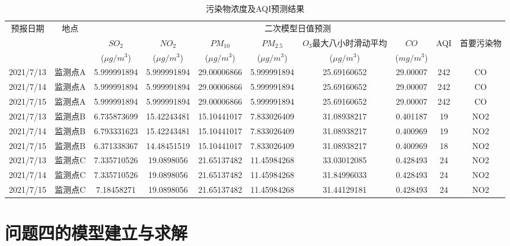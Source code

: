 \documentclass[a4paper,10pt]{my_paper}
\numberwithin{equation}{section}
\begin{document}
\begin{table}[htbp]\footnotesize
  \centering
  \caption{污染物浓度及AQI预测结果}\label{tab-Q3_AQI计算结果}%
    \begin{tabular}{cccccccccc}
    \toprule
    \multirow{3}[2]{*}{预报日期} & \multirow{3}[2]{*}{地点} & \multicolumn{8}{c}{二次模型日值预测} \\
          &       & ${SO_2}$   & ${NO_2}$   & ${PM_10}$  & ${PM_2.5}$  & ${O_3}$最大八小时滑动平均 & ${CO}$    & \multicolumn{1}{c}{\multirow{2}[1]{*}{AQI}} & \multicolumn{1}{c}{\multirow{2}[1]{*}{首要污染物}} \\
          &       & (${\mu g/m^3}$) & (${\mu g/m^3}$) & (${\mu g/m^3}$) & (${\mu g/m^3}$) &  (${\mu g/m^3}$) &  (${mg/m^3}$) &       &  \\
    \midrule
    2021/7/13 & 监测点A  & 5.999991894 & 5.999991894 & 29.00006866 & 5.999991894 & 25.69160652 & 29.00007 & 242   & CO \\
    2021/7/14 & 监测点A  & 5.999991894 & 5.999991894 & 29.00006866 & 5.999991894 & 25.69160652 & 29.00007 & 242   & CO \\
    2021/7/15 & 监测点A  & 5.999991894 & 5.999991894 & 29.00006866 & 5.999991894 & 25.69160652 & 29.00007 & 242   & CO \\
    2021/7/13 & 监测点B  & 6.735873699 & 15.42243481 & 15.10441017 & 7.833026409 & 31.08938217 & 0.401187 & 19    & NO2 \\
    2021/7/14 & 监测点B  & 6.793331623 & 15.42243481 & 15.10441017 & 7.833026409 & 31.08938217 & 0.400969 & 19    & NO2 \\
    2021/7/15 & 监测点B  & 6.371338367 & 14.48451519 & 15.10441017 & 7.833026409 & 31.08938217 & 0.400969 & 18    & NO2 \\
    2021/7/13 & 监测点C  & 7.335710526 & 19.0898056 & 21.65137482 & 11.45984268 & 33.03012085 & 0.428493 & 24    & NO2 \\
    2021/7/14 & 监测点C  & 7.335710526 & 19.0898056 & 21.65137482 & 11.45984268 & 31.84996033 & 0.428493 & 24    & NO2 \\
    2021/7/15 & 监测点C  & 7.18458271 & 19.0898056 & 21.65137482 & 11.45984268 & 31.44129181 & 0.428493 & 24    & NO2 \\
    \bottomrule
    \end{tabular}%
\end{table}%

\section{问题四的模型建立与求解}
\end{document}
